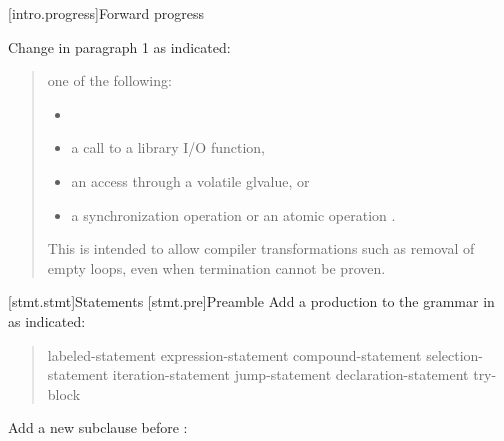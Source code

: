[intro.progress]{Forward progress} 

Change in  paragraph 1 as indicated:

\begin{quote}
\pnum
{}
 one of the following:

\begin{itemize}
\tightlist
\item
\item
  a call to a library I/O function,
\item
  an access through a volatile glvalue, or
\item
  a synchronization operation or an atomic operation
  .
\end{itemize}

\begin{note}
This is intended to allow compiler transformations
such as removal of empty loops, even when termination cannot be proven.
\end{note}
\end{quote}

\setcounter{chapter}{7}

[stmt.stmt]{Statements}
[stmt.pre]{Preamble}  
\pnum
Add a production to the grammar in  as indicated:

\begin{quote}
\begin{bnf}
\br
    labeled-statement\br
     expression-statement\br
     compound-statement\br
     selection-statement\br
     iteration-statement\br
     jump-statement\br
    declaration-statement\br
     try-block\br
\end{bnf}
\end{quote}

\setcounter{section}{7}

Add a new subclause before :

